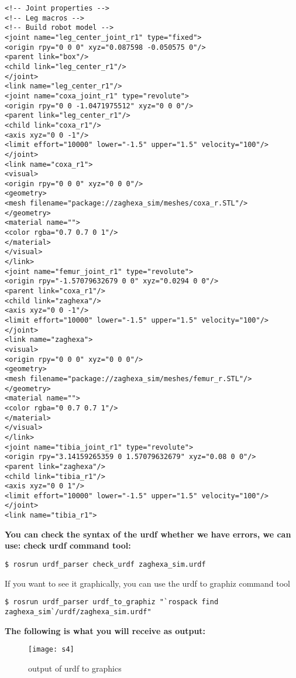 \documentclass[a4paper]{article}
\begin{document}
\begin{lstlisting}
<!-- Joint properties -->
<!-- Leg macros -->
<!-- Build robot model -->
<joint name="leg_center_joint_r1" type="fixed">
<origin rpy="0 0 0" xyz="0.087598 -0.050575 0"/>
<parent link="box"/>
<child link="leg_center_r1"/>
</joint>
<link name="leg_center_r1"/>
<joint name="coxa_joint_r1" type="revolute">
<origin rpy="0 0 -1.0471975512" xyz="0 0 0"/>
<parent link="leg_center_r1"/>
<child link="coxa_r1"/>
<axis xyz="0 0 -1"/>
<limit effort="10000" lower="-1.5" upper="1.5" velocity="100"/>
</joint>
<link name="coxa_r1">
<visual>
<origin rpy="0 0 0" xyz="0 0 0"/>
<geometry>
<mesh filename="package://zaghexa_sim/meshes/coxa_r.STL"/>
</geometry>
<material name="">
<color rgba="0.7 0.7 0 1"/>
</material>
</visual>
</link>
<joint name="femur_joint_r1" type="revolute">
<origin rpy="-1.57079632679 0 0" xyz="0.0294 0 0"/>
<parent link="coxa_r1"/>
<child link="zaghexa"/>
<axis xyz="0 0 -1"/>
<limit effort="10000" lower="-1.5" upper="1.5" velocity="100"/>
</joint>
<link name="zaghexa">
<visual>
<origin rpy="0 0 0" xyz="0 0 0"/>
<geometry>
<mesh filename="package://zaghexa_sim/meshes/femur_r.STL"/>
</geometry>
<material name="">
<color rgba="0 0.7 0.7 1"/>
</material>
</visual>
</link>
<joint name="tibia_joint_r1" type="revolute">
<origin rpy="3.14159265359 0 1.57079632679" xyz="0.08 0 0"/>
<parent link="zaghexa"/>
<child link="tibia_r1"/>
<axis xyz="0 0 1"/>
<limit effort="10000" lower="-1.5" upper="1.5" velocity="100"/>
</joint>
<link name="tibia_r1">
\end{lstlisting}
\textbf{You can check the syntax of the urdf whether we have errors, we can use:
check urdf command tool:}
\begin{lstlisting}
$ rosrun urdf_parser check_urdf zaghexa_sim.urdf
\end{lstlisting}

If you want to see it graphically, you can use the urdf to graphiz command tool

\begin{lstlisting}
$ rosrun urdf_parser urdf_to_graphiz "`rospack find zaghexa_sim`/urdf/zaghexa_sim.urdf"
\end{lstlisting}
\textbf{The following is what you will receive as output:}

\begin{figure}[h]
	\centering
	\texttt{[image: s4]}
	\caption{output of urdf to graphics}
	\label{figure :s4}
\end{figure}
\end{document}
